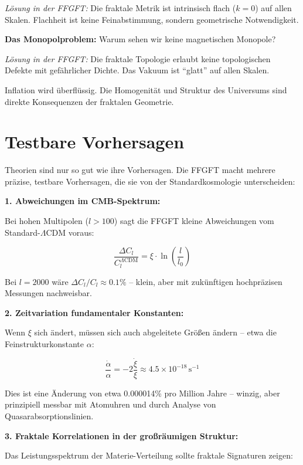 \documentclass[12pt,a4paper]{article}
\begin{document}
\textit{Lösung in der FFGFT:} Die fraktale Metrik ist intrinsisch flach ($k=0$) auf allen Skalen. Flachheit ist keine Feinabstimmung, sondern geometrische Notwendigkeit.

\textbf{Das Monopolproblem:} Warum sehen wir keine magnetischen Monopole?

\textit{Lösung in der FFGFT:} Die fraktale Topologie erlaubt keine topologischen Defekte mit gefährlicher Dichte. Das Vakuum ist ``glatt'' auf allen Skalen.

Inflation wird überflüssig. Die Homogenität und Struktur des Universums sind direkte Konsequenzen der fraktalen Geometrie.

\section{Testbare Vorhersagen}

Theorien sind nur so gut wie ihre Vorhersagen. Die FFGFT macht mehrere präzise, testbare Vorhersagen, die sie von der Standardkosmologie unterscheiden:

\textbf{1. Abweichungen im CMB-Spektrum:}

Bei hohen Multipolen ($l > 100$) sagt die FFGFT kleine Abweichungen vom Standard-$\Lambda$CDM voraus:

\begin{equation}
\frac{\Delta C_l}{C_l^{\Lambda\text{CDM}}} = \xi \cdot \ln\left(\frac{l}{l_0}\right)
\end{equation}

Bei $l = 2000$ wäre $\Delta C_l/C_l \approx 0.1\%$ -- klein, aber mit zukünftigen hochpräzisen Messungen nachweisbar.

\textbf{2. Zeitvariation fundamentaler Konstanten:}

Wenn $\xi$ sich ändert, müssen sich auch abgeleitete Größen ändern -- etwa die Feinstrukturkonstante $\alpha$:

\begin{equation}
\frac{\dot{\alpha}}{\alpha} = -2 \frac{\dot{\xi}}{\xi} \approx 4.5 \times 10^{-18} \, \text{s}^{-1}
\end{equation}

Dies ist eine Änderung von etwa 0.000014\% pro Million Jahre -- winzig, aber prinzipiell messbar mit Atomuhren und durch Analyse von Quasarabsorptionslinien.

\textbf{3. Fraktale Korrelationen in der großräumigen Struktur:}

Das Leistungsspektrum der Materie-Verteilung sollte fraktale Signaturen zeigen:
\end{document}
